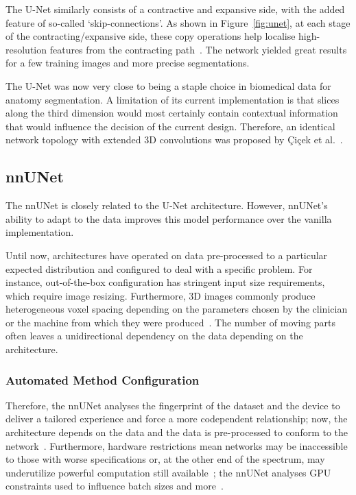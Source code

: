 \documentclass[12pt,twoside]{report}
\begin{document}
The U-Net similarly consists of a contractive and expansive side, with the added feature of so-called `skip-connections'. As shown in Figure~\ref{fig:unet}, at each stage of the contracting/expansive side, these copy operations help localise high-resolution features from the contracting path~\cite{U-Net}. The network yielded great results for a few training images and more precise segmentations.


The U-Net was now very close to being a staple choice in biomedical data for anatomy segmentation. A limitation of its current implementation is that slices along the third dimension would most certainly contain contextual information that would influence the decision of the current design. Therefore, an identical network topology with extended 3D convolutions was proposed by \c{C}i{\c{c}}ek et al.~\cite{DBLP:journals/corr/CicekALBR16}.

\subsection{nnUNet}\label{sect:nnunet}

The nnUNet is closely related to the U-Net architecture. However, nnUNet's ability to adapt to the data improves this model performance over the vanilla implementation.

Until now, architectures have operated on data pre-processed to a particular expected distribution and configured to deal with a specific problem. For instance, out-of-the-box configuration has stringent input size requirements, which require image resizing. Furthermore, 3D images commonly produce heterogeneous voxel spacing depending on the parameters chosen by the clinician or the machine from which they were produced~\cite{nnunet}. The number of moving parts often leaves a unidirectional dependency on the data depending on the architecture. 

\subsubsection{Automated Method Configuration}

Therefore, the nnUNet analyses the fingerprint of the dataset and the device to deliver a tailored experience and force a more codependent relationship; now, the architecture depends on the data and the data is pre-processed to conform to the network~\cite{nnunet}. Furthermore, hardware restrictions mean networks may be inaccessible to those with worse specifications or, at the other end of the spectrum, may underutilize powerful computation still available~\cite{nnunet}; the nnUNet analyses GPU constraints used to influence batch sizes and more~\cite{nnunet-git-paper}.
\end{document}
